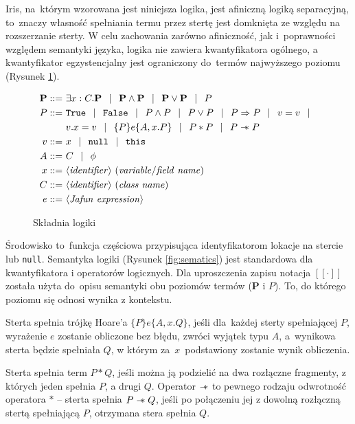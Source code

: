 \documentclass[]{pracamgr}
\newcommand \wand {\mathrel{-\mkern-6mu*}}
\newcommand \outerP {\mathbf{P}}
\newcommand \hoare [5] {\{#1\}#2\{#3,#4.#5\}}
\renewcommand \| {\hspace{0.75em} | \hspace{0.75em} }
\renewcommand \[ {[\![}
\renewcommand \] {]\!]}
\begin{document}
Iris, na~którym wzorowana jest niniejsza logika, jest afiniczną logiką separacyjną, to~znaczy
własność spełniania termu przez stertę jest domknięta ze względu na rozszerzanie sterty.
W celu zachowania zarówno afiniczność, jak i~poprawności względem semantyki
języka, logika nie zawiera kwantyfikatora ogólnego, a kwantyfikator egzystencjalny jest ograniczony
do~termów najwyższego poziomu (Rysunek \ref{fig:syntax}).

\begin{figure}[h]
\begin{align*}
 \outerP ::= & \ \exists x : C.\outerP \| \outerP \wedge \outerP \| \outerP \vee \outerP \| P \\
 P ::= & \ \mathtt{True} \| \mathtt{False} \| P \wedge P \| P \vee P \| P \Rightarrow P \| v = v \| \\
     & \  v.x = v \| \hoare{P}{e}{A}{x}{P} \|  P * P \| P \wand P \\
 v ::= & \  x \| \mathtt{null} \| \mathtt{this} \\
 A ::= & \ C \| \phi \\
 x ::= & \ \langle\mathit{identifier}\rangle \ (\mathit{variable / field\ name}) \\
 C ::= & \ \langle\mathit{identifier}\rangle \ (\mathit{class\ name}) \\
 e ::= & \ \langle \mathit{Jafun\ expression} \rangle
\end{align*}
\caption{Składnia logiki}
\label{fig:syntax}
\end{figure}

Środowisko to~funkcja częściowa przypisująca identyfikatorom lokacje na stercie lub \texttt{null}.
Semantyka logiki (Rysunek \ref{fig:sematics}) jest standardowa dla kwantyfikatora i operatorów logicznych.
Dla uproszczenia zapisu notacja $\[ \cdot \]$ została użyta do~opisu semantyki obu poziomów termów
($\outerP$ i $P$). To, do którego poziomu się odnosi wynika z kontekstu.

Sterta spełnia trójkę Hoare'a $\hoare{P}{e}{A}{x}{Q}$, jeśli dla~każdej sterty spełniającej
$P$, wyrażenie $e$ zostanie obliczone bez błędu, zwróci wyjątek typu $A$,
a~wynikowa sterta będzie
spełniała $Q$, w którym za~$x$~podstawiony zostanie wynik obliczenia.

Sterta spełnia term $P * Q$, jeśli można ją podzielić na dwa rozłączne fragmenty, z których
jeden spełnia $P$, a drugi $Q$.
Operator $\wand$ to pewnego rodzaju odwrotność operatora $*$ -- sterta spełnia $P \wand Q$, jeśli
po połączeniu jej z dowolną rozłączną stertą spełniającą $P$, otrzymana stera spełnia $Q$.
\end{document}
